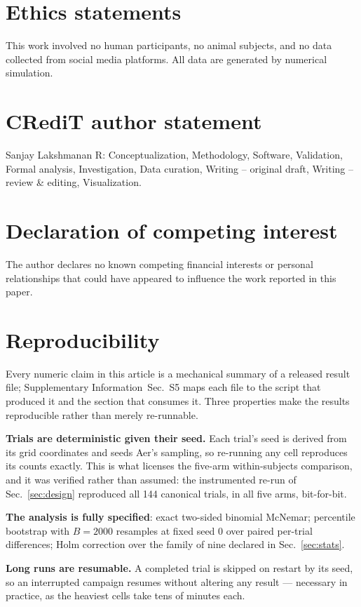 \documentclass[preprint,11pt]{elsarticle}
\newcommand{\SI}{Supplementary Information}
\newcommand{\SIartifacts}{\SI{}~Sec.~S5}
\begin{document}
\section*{Ethics statements}
This work involved no human participants, no animal subjects, and no data
collected from social media platforms. All data are generated by
numerical simulation.

\section*{CRediT author statement}
\noindent
Sanjay Lakshmanan R: Conceptualization, Methodology, Software,
Validation, Formal analysis, Investigation, Data curation,
Writing -- original draft, Writing -- review \& editing, Visualization.

\section*{Declaration of competing interest}
The author declares no known competing financial interests or personal
relationships that could have appeared to influence the work reported in
this paper.

\section*{Reproducibility}

Every numeric claim in this article is a mechanical summary of a released
result file; \SIartifacts{} maps each file to the script
that produced it and the section that consumes it. Three properties make
the results reproducible rather than merely re-runnable.

\textbf{Trials are deterministic given their seed.} Each trial's seed is
derived from its grid coordinates and seeds Aer's sampling, so re-running
any cell reproduces its counts exactly. This is what licenses the
five-arm within-subjects comparison, and it was verified rather than
assumed: the instrumented re-run of Sec.~\ref{sec:design} reproduced all
144 canonical trials, in all five arms, bit-for-bit.

\textbf{The analysis is fully specified}: exact two-sided binomial
McNemar; percentile bootstrap with $B=2000$ resamples at fixed seed 0
over paired per-trial differences; Holm correction over the family of
nine declared in Sec.~\ref{sec:stats}.

\textbf{Long runs are resumable.} A completed trial is skipped on restart
by its seed, so an interrupted campaign resumes without altering any
result --- necessary in practice, as the heaviest cells take tens of
minutes each.
\end{document}

